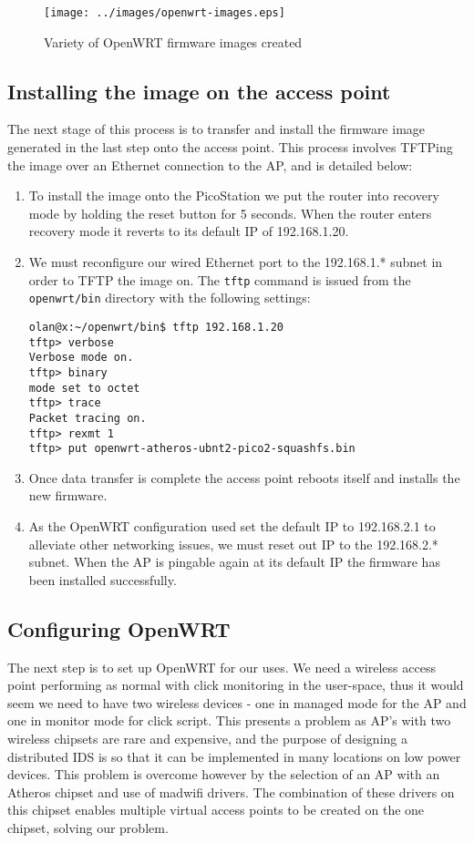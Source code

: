 \begin{figure}[h]
 \centering
 \texttt{[image: ../images/openwrt-images.eps]}
 \caption{Variety of OpenWRT firmware images created}
 \label{fig:openwrt-images}
\end{figure}

\subsection{Installing the image on the access point}

The next stage of this process is to transfer and install the firmware image generated in the last step onto the access point. This process involves TFTPing the image over an Ethernet connection to the AP, and is detailed below: 
\begin{enumerate} 
\item To install the image onto the PicoStation we put the router into recovery mode by holding the reset button for 5 seconds. When the router enters recovery mode it reverts to its default IP of 192.168.1.20. 
\item We must reconfigure our wired Ethernet port to the 192.168.1.* subnet in order to TFTP the image on. The \texttt{tftp} command is issued from the \texttt{openwrt/bin} directory with the following settings:
\begin{lstlisting}
olan@x:~/openwrt/bin$ tftp 192.168.1.20
tftp> verbose
Verbose mode on.
tftp> binary
mode set to octet
tftp> trace
Packet tracing on.
tftp> rexmt 1
tftp> put openwrt-atheros-ubnt2-pico2-squashfs.bin
\end{lstlisting}

\item Once data transfer is complete the access point reboots itself and installs the new firmware.
\item As the OpenWRT configuration used set the default IP to 192.168.2.1 to alleviate other networking issues, we must reset out IP to the 192.168.2.* subnet. When the AP is pingable again at its default IP the firmware has been installed successfully.
\end{enumerate}

\subsection{Configuring OpenWRT}
The next step is to set up OpenWRT for our uses. We need a wireless access point performing as normal with click monitoring in the user-space, thus it would seem we need to have two wireless devices - one in managed mode for the AP and one in monitor mode for click script. This presents a problem as AP's with two wireless chipsets are rare and expensive, and the purpose of designing a distributed IDS is so that it can be implemented in many locations on low power devices. This problem is overcome however by the selection of an AP with an Atheros chipset and use of madwifi drivers. The combination of these drivers on this chipset enables multiple virtual access points to be created on the one chipset, solving our problem.

